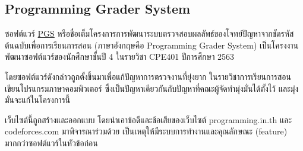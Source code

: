 \documentclass[12pt,oneside,openright,a4paper]{cpe-thai-project}
\begin{document}
    \subsection{Programming Grader System}
    \begin{flushleft}
    ซอฟต์แวร์ \href{https://pgs.bangmodhackathon.com}{PGS} หรือชื่อเต็มโครงการการพัฒนาระบบตรวจสอบผลลัพธ์ของโจทย์ปัญหาจากชัดรหัสต้นฉบับเพื่อการเรียนการสอน (ภาษาอังกฤษคือ Programming Grader System) เป็นโครงงานพัฒนาซอฟต์แวร์ของนักศึกษาชั้นปี 4 ในรายวิชา CPE401 ปีการศึกษา 2563~\cite{nattawat20}
    \end{flushleft}
    \begin{flushleft}
    โดยซอฟต์แวร์ดังกล่าวถูกตั้งขึ้นมาเพื่อแก้ปัญหาการตรวจงานที่ยุ่งยาก ในรายวิชาการเรียนการสอนเขียนโปรแกรมภาษาคอมพิวเตอร์ ซึ่งเป็นปัญหาเดียวกันกับปัญหาที่คณะผู้จัดทำมุ่งมั่นได้ตั้งไว้ และมุ่งมั่นจะแก้ในโครงการนี้
    \end{flushleft}
    \begin{flushleft}
    เว็บไซต์นี้ถูกสร้างและออกแบบ โดยนำเอาข้อดีและช้อเสียของเว็บไซต์ programming.in.th และ codeforces.com มาพิจารณาร่วมด้วย เป็นเหตุให้มีระบบการทำงานและคุณลักษณะ (feature) มากกว่าซอฟต์แวร์ในหัวข้อก่อน
    \end{flushleft}
\end{document}
